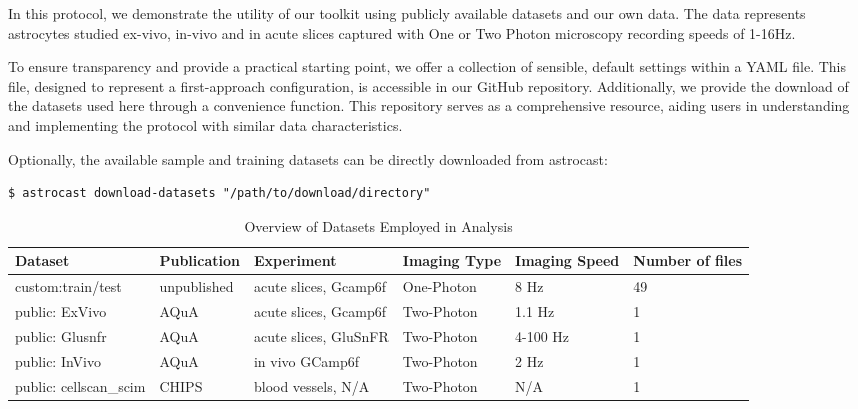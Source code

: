 In this protocol, we demonstrate the utility of our toolkit using publicly available datasets and our own data.
The data represents astrocytes studied ex-vivo, in-vivo and in acute slices captured with One or Two Photon
microscopy recording speeds of 1-16Hz.

To ensure transparency and provide a practical starting point, we offer a collection of sensible, default settings
within a YAML file.
This file, designed to represent a first-approach configuration, is accessible in our GitHub repository.
Additionally, we provide the download of the datasets used here through a convenience function.
This repository serves as a comprehensive resource, aiding users in understanding and implementing the protocol with
similar data characteristics.


Optionally, the available sample and training datasets can be directly downloaded from astrocast:
\begin{lstlisting}[style=bashStyle]
    $ astrocast download-datasets "/path/to/download/directory"
\end{lstlisting}


\begin{table}[ht]
    \centering
    \caption{Overview of Datasets Employed in Analysis}
    \begin{tabular}{|l|l|l|l|l|l|}
        \hline
        \textbf{Dataset}       & \textbf{Publication} & \textbf{Experiment}   & \textbf{Imaging Type} & \textbf{
            Imaging Speed} & \textbf{Number of files} \\ \hline
        custom:train/test      & unpublished          & acute slices, Gcamp6f & One-Photon            & 8 Hz
        & 49                       \\ \hline
        public: ExVivo         & AQuA                 & acute slices, Gcamp6f & Two-Photon            & 1.1 Hz
        & 1                        \\ \hline
        public: Glusnfr        & AQuA                 & acute slices, GluSnFR & Two-Photon            & 4-100 Hz
        & 1                        \\ \hline
        public: InVivo         & AQuA                 & in vivo GCamp6f       & Two-Photon            & 2 Hz
        & 1                        \\ \hline
        public: cellscan\_scim & CHIPS                & blood vessels, N/A    & Two-Photon            & N/A
        & 1                        \\ \hline
    \end{tabular}
\end{table}

